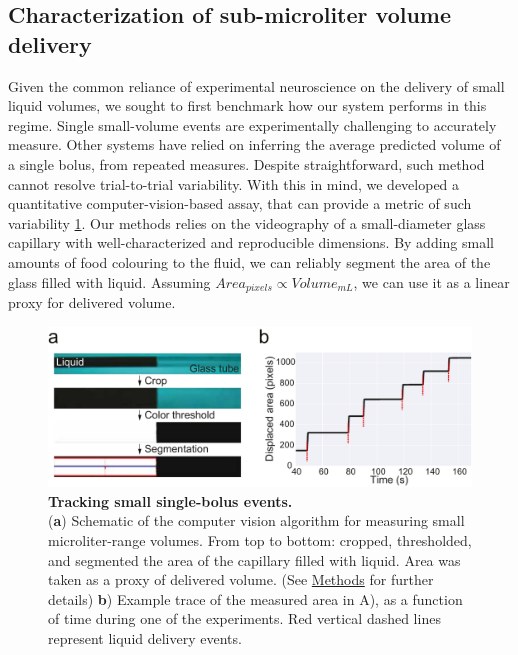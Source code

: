 \subsection*{Characterization of sub-microliter volume delivery}

Given the common reliance of experimental neuroscience on the delivery of small liquid volumes, we sought to first benchmark how our system performs in this regime. Single small-volume events are experimentally challenging to accurately measure. Other systems have relied on inferring the average predicted volume of a single bolus, from repeated measures. Despite straightforward, such method cannot resolve trial-to-trial variability. With this in mind, we developed a quantitative computer-vision-based assay, that can provide a metric of such variability \cref{fig:PumpProtocol}. Our methods relies on the videography of a small-diameter glass capillary with well-characterized and reproducible dimensions. By adding small amounts of food colouring to the fluid, we can reliably segment the area of the glass filled with liquid. Assuming $Area_{pixels} \propto Volume_{mL}$, we can use it as a linear proxy for delivered volume. 

\begin{figure} 
	\centering
	\includegraphics[width=1.0\linewidth]{Figures/Artboard 1_1.pdf}
	\caption{\textbf{Tracking small single-bolus events.}\\
		(\textbf{a}) Schematic of the computer vision algorithm for measuring small microliter-range volumes. From top to bottom: cropped, thresholded, and segmented the area of the capillary filled with liquid. Area was taken as a proxy of delivered volume. (See \hyperref[s:methods]{Methods} for further details)  \textbf{b}) Example trace of the measured area in A), as a function of time during one of the experiments. Red vertical dashed lines represent liquid delivery events.}
	\label{fig:PumpProtocol}  
\end{figure}

